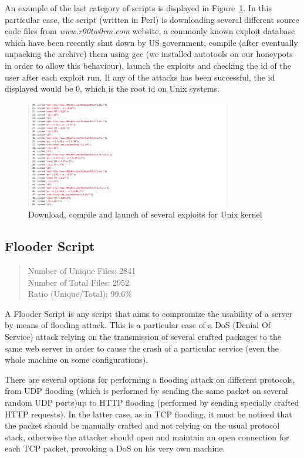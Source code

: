 An example of the last category of scripts is displayed in Figure~\ref{fig:localExploit}. In this particular case, the script (written in Perl) is downloading several different source code files from \emph{www.r00tw0rm.com} website, a commonly known exploit database which have been recently shut down by US government, compile (after eventually unpacking the archive) them using gcc (we installed autotools on our honeypots in order to allow this behaviour), launch the exploits and checking the id of the user after each exploit run. If any of the attacks has been successful, the id displayed would be 0, which is the root id on Unix systems.

\begin{figure}[H]
\centerline{\includegraphics[width=0.8\textwidth]{Images/localExploit.jpg}}
\caption{Download, compile and launch of several exploits for Unix kernel\label{fig:localExploit}}
\end{figure}

\subsection{Flooder Script}

\begin{quote}
Number of Unique Files: 2841\\
Number of Total Files: 2952\\
Ratio (Unique/Total): 99.6\%
\end{quote}

A Flooder Script is any script that aims to compromize the usability of a server by means of flooding attack. This is a particular case of a DoS (Denial Of Service) attack relying on the transmission of several crafted packages to the same web server in order to cause the crash of a particular service (even the whole machine on some configurations).

There are several options for performing a flooding attack on different protocols, from UDP flooding (which is performed by sending the same packet on several random UDP ports)up to HTTP flooding (performed by sending specially crafted HTTP requests). In the latter case, as in TCP flooding, it must be noticed that the packet should be manually crafted and not relying on the usual protocol stack, otherwise the attacker should open and maintain an open connection for each TCP packet, provoking a DoS on his very own machine.

